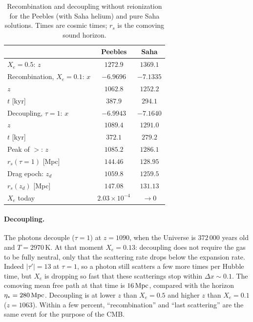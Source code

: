\begin{table}
\caption{Recombination and decoupling without reionization for the Peebles (with Saha helium) and pure Saha
solutions. Times are cosmic times; $r_s$ is the comoving sound horizon.}
\label{tab:m2}
\begin{ruledtabular}
\begin{tabular}{lcc}
 & Peebles & Saha \\
\hline
$X_e=0.5$: $z$ & $1272.9$ & $1369.1$ \\
Recombination, $X_e=0.1$: $x$ & $-6.9696$ & $-7.1335$ \\
\phantom{Recombination,} $z$ & $1062.8$ & $1252.2$ \\
\phantom{Recombination,} $t$ [kyr] & $387.9$ & $294.1$ \\
Decoupling, $\tau=1$: $x$ & $-6.9943$ & $-7.1640$ \\
\phantom{Decoupling,} $z$ & $1089.4$ & $1291.0$ \\
\phantom{Decoupling,} $t$ [kyr] & $372.1$ & $279.2$ \\
Peak of $\gt$: $z$ & $1085.2$ & $1286.1$ \\
$r_s(\tau=1)$ [Mpc] & $144.46$ & $128.95$ \\
Drag epoch: $z_d$ & $1059.8$ & $1259.5$ \\
$r_s(z_d)$ [Mpc] & $147.08$ & $131.13$ \\
$X_e$ today & $2.03\times10^{-4}$ & $\to0$ \\
\end{tabular}
\end{ruledtabular}
\end{table}

\paragraph*{Decoupling.} The photons decouple ($\tau=1$) at $z=1090$, when the Universe is $372\,000$ years old and
$T=2970$\,K. At that moment $X_e=0.13$: decoupling does not require the gas to be fully neutral, only that the
scattering rate drops below the expansion rate. Indeed $|\tau'|=13$ at $\tau=1$, so a photon still scatters a few
more times per Hubble time, but $X_e$ is dropping so fast that these scatterings stop within $\Delta x\sim0.1$. The
comoving mean free path at that time is $16\,\mathrm{Mpc}$, compared with the horizon $\eta_*=280\,\mathrm{Mpc}$. Decoupling is at lower
$z$ than $X_e=0.5$ and higher $z$ than $X_e=0.1$ ($z=1063$). Within a few percent, ``recombination'' and ``last
scattering'' are the same event for the purpose of the CMB.

